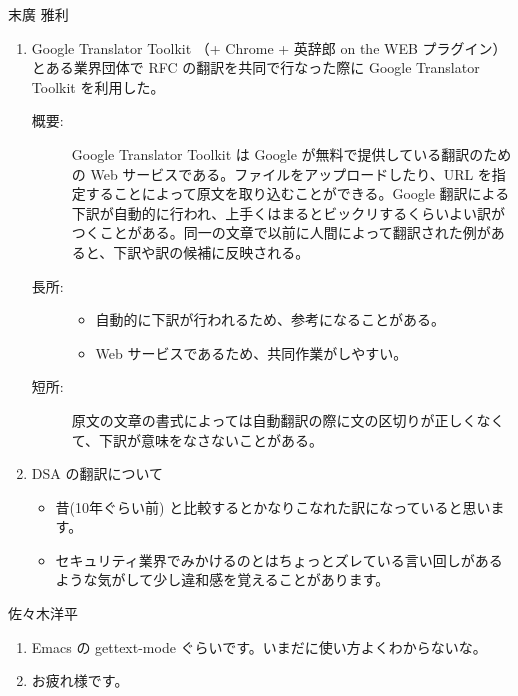 \documentclass[mingoth,a4paper]{jsarticle}
\begin{document}
\begin{prework}{ 末廣 雅利 }

\begin{enumerate}
\item Google Translator Toolkit （+ Chrome + 英辞郎 on the WEB プラグイン）
とある業界団体で RFC の翻訳を共同で行なった際に Google Translator Toolkit を利用した。

\begin{description}
\item [概要:] Google Translator Toolkit は Google が無料で提供している翻訳のための Web サービスである。ファイルをアップロードしたり、URL を指定することによって原文を取り込むことができる。Google 翻訳による下訳が自動的に行われ、上手くはまるとビックリするくらいよい訳がつくことがある。同一の文章で以前に人間によって翻訳された例があると、下訳や訳の候補に反映される。
\item [長所:]
\begin{itemize}
\item 自動的に下訳が行われるため、参考になることがある。
\item Web サービスであるため、共同作業がしやすい。
\end{itemize}
\item [短所:] 原文の文章の書式によっては自動翻訳の際に文の区切りが正しくなくて、下訳が意味をなさないことがある。
\end{description}

\item DSA の翻訳について
\begin{itemize}
\item 昔(10年ぐらい前) と比較するとかなりこなれた訳になっていると思います。
\item セキュリティ業界でみかけるのとはちょっとズレている言い回しがあるような気がして少し違和感を覚えることがあります。
\end{itemize}
\end{enumerate}

\end{prework}

\begin{prework}{ 佐々木洋平 }
\begin{enumerate}
\item Emacs の gettext-mode ぐらいです。いまだに使い方よくわからないな。

\item お疲れ様です。
\end{enumerate}
\end{prework}
\end{document}
